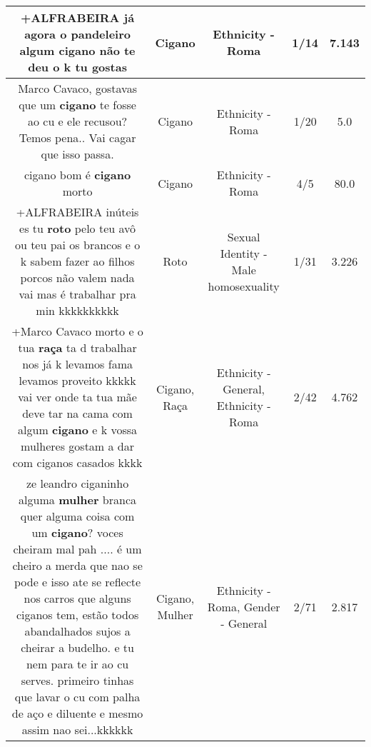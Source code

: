 \documentclass[11pt]{article}
\newlength\mylength
\begin{document}
\begin{center}
\begin{longtable}{|C{.65\mylength}|C{.30\mylength}|C{.12\mylength}|C{.12\mylength}|C{.12\mylength}|}
  \small +ALFRABEIRA já agora o pandeleiro algum \textbf{cigano} não te deu o k tu gostas\normalsize   & Cigano & Ethnicity - Roma & 1/14 & 7.143 \\  \hline
  \small Marco Cavaco, gostavas que um \textbf{cigano} te fosse ao cu e ele recusou? Temos pena.. Vai cagar que isso passa.\normalsize   & Cigano & Ethnicity - Roma & 1/20 & 5.0 \\  \hline
  \small cigano bom é \textbf{cigano} morto\normalsize   & Cigano & Ethnicity - Roma & 4/5 & 80.0 \\  \hline
  \small +ALFRABEIRA inúteis es tu \textbf{roto} pelo teu avô ou teu pai os brancos e o k sabem fazer ao filhos porcos não valem nada vai mas é trabalhar pra min kkkkkkkkkk\normalsize   & Roto & Sexual Identity - Male homosexuality & 1/31 & 3.226 \\  \hline
  \small +Marco Cavaco morto e o tua \textbf{raça} ta d trabalhar nos já k levamos fama levamos proveito kkkkk vai ver onde ta tua mãe deve tar na cama com algum \textbf{cigano} e k vossa mulheres gostam a dar com ciganos casados kkkk\normalsize   & Cigano, Raça & Ethnicity - General, Ethnicity - Roma & 2/42 & 4.762 \\  \hline
  \small ze leandro ciganinho alguma \textbf{mulher} branca quer alguma coisa com um \textbf{cigano}? voces cheiram mal pah .... é um cheiro a merda que nao se pode  e isso ate se reflecte nos carros que alguns ciganos tem, estão todos abandalhados sujos a cheirar a budelho. e tu nem para te ir ao cu serves. primeiro tinhas que lavar o cu com palha de aço e diluente e mesmo assim nao sei...kkkkkk\normalsize   & Cigano, Mulher & Ethnicity - Roma, Gender - General & 2/71 & 2.817 \\  \hline

\end{longtable}
\end{center}
\end{document}
